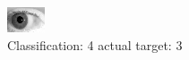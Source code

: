 \begin{figure}[h!]
\begin{center}
\includegraphics[width=0.60\columnwidth]{figures/ID180_class_4_target_3.png}
\end{center}
\caption{ Classification: 4 actual target: 3}
\label{fig:ID180_class_4_target_3}
\end{figure}
